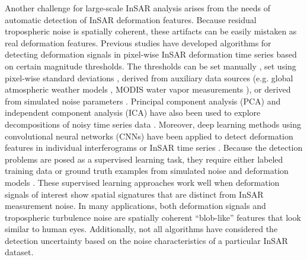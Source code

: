 Another challenge for large-scale InSAR analysis arises from the needs of automatic detection of InSAR deformation features. Because residual tropospheric noise is spatially coherent, these artifacts can be easily mistaken as real deformation features. Previous studies have developed algorithms for detecting deformation signals in pixel-wise InSAR deformation time series based on certain magnitude thresholds. The thresholds can be set manually \citep{Raspini2018ContinuousSemiAutomatic}, set using pixel-wise standard deviations \citep{Bekaert2020InsarBasedDetection}, derived from auxiliary data sources (e.g. global atmospheric weather models \citep{Parker2015SystematicAssessmentAtmospheric}, MODIS water vapor measurements \citep{Barnhart2013CharacterizingEstimatingNoise}), or derived from simulated noise parameters \citep{Havazli2021DetectionThresholdEstimates}. Principal component analysis (PCA) and independent component analysis (ICA) have also been used to explore decompositions of noisy time series data \citep{Chaussard2014PredictabilityHydraulicHead, Ebmeier2016ApplicationIndependentComponent, Gaddes2018BlindSignalSeparation}. Moreover, deep learning methods using convolutional neural networks (CNNs) have been applied to detect deformation features in individual interferograms \citep{Anantrasirichai2018ApplicationMachineLearning, Anantrasirichai2019ApplicationConvolutionalNeural} or InSAR time series \citep{RouetLeduc2021AutonomousExtractionMillimeter}. Because the detection problems are posed as a supervised learning task, they require either labeled training data \citep{Anantrasirichai2018ApplicationMachineLearning} or ground truth examples from simulated noise and deformation models \citep{Anantrasirichai2019DeepLearningApproach, RouetLeduc2021AutonomousExtractionMillimeter}. These supervised learning approaches work well when deformation signals of interest show spatial signatures that are distinct from InSAR measurement noise. In many applications, both deformation signals and tropospheric turbulence noise are spatially coherent ``blob-like'' features that look similar to human eyes.
Additionally, not all algorithms have considered the detection uncertainty based on the noise characteristics of a particular InSAR dataset. 



